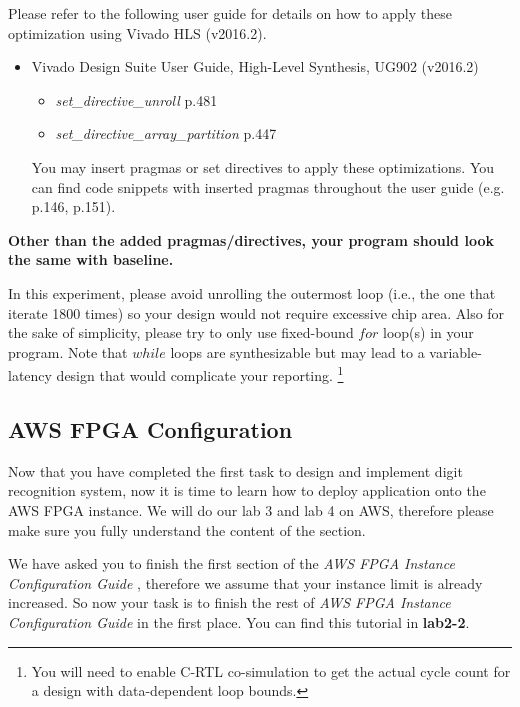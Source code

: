 \documentclass[paper=letter, fontsize=10pt]{scrartcl} %
\numberwithin{equation}{section} %
\numberwithin{figure}{section} %
\numberwithin{table}{section} %
\def\awstutorial{\textit{AWS FPGA Instance Configuration Guide }}
\begin{document}
Please refer to the following user guide for details on how to apply these optimization using Vivado HLS (v2016.2). 

\begin{itemize}
\item Vivado Design Suite User Guide, High-Level Synthesis, UG902 (v2016.2)~\cite{ug902}
\begin{itemize}
\item \textit{set\_directive\_unroll} p.481
\item \textit{set\_directive\_array\_partition} p.447
\end{itemize}
You may insert pragmas or set directives to apply these optimizations. You can find code snippets with inserted pragmas throughout the user guide (e.g. p.146, p.151).
\end{itemize}

\textbf{Other than the added pragmas/directives, your program should look the same with baseline.}

In this experiment, please avoid unrolling the outermost loop (i.e., the one that iterate 1800 times) so your design would not require excessive chip area. Also for the sake of simplicity, please try to only use fixed-bound $for$ loop(s) in your program. Note that $while$ loops are synthesizable but may lead to a variable-latency design that would  complicate your reporting. \footnote{You will need to enable C-RTL co-simulation to get the actual cycle count for a design with data-dependent loop bounds.} 

\subsection{AWS FPGA Configuration}
Now that you have completed the first task to design and implement digit recognition system, now it is time to learn how to deploy application onto the AWS FPGA instance. We will do our lab 3 and lab 4 on AWS, therefore please make sure you fully understand the content of the section.

We have asked you to finish the first section of the \awstutorial, therefore we assume that your instance limit is already increased. So now your task is to finish the rest of \awstutorial in the first place. You can find this tutorial in \textbf{lab2-2}.
\end{document}
